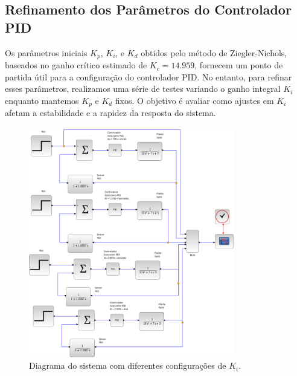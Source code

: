 \subsection{Refinamento dos Parâmetros do Controlador PID}
Os parâmetros iniciais \( K_p \), \( K_i \), e \( K_d \) obtidos pelo método de Ziegler-Nichols, baseados no ganho crítico estimado de \( K_c = 14.959 \), fornecem um ponto de partida útil para a configuração do controlador PID. No entanto, para refinar esses parâmetros, realizamos uma série de testes variando o ganho integral \( K_i \) enquanto mantemos \( K_p \) e \( K_d \) fixos. O objetivo é avaliar como ajustes em \( K_i \) afetam a estabilidade e a rapidez da resposta do sistema.

\begin{figure}[H]
    \centering
    \includegraphics[width=0.8\textwidth]{6-atividade/assets/diagrama-pid-ajustando-ki.png}
    \caption{Diagrama do sistema com diferentes configurações de \( K_i \).}
    \label{fig:diagram-pid-adjusting-ki}
\end{figure}


